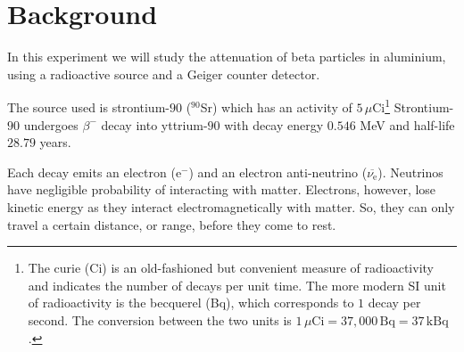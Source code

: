 \section{Background}%

In this experiment we will study the attenuation of beta particles in aluminium, using a radioactive source and a Geiger counter detector. 

The source used is strontium-$90$ ($^{90}$Sr) which has an activity of $5\,\mu$Ci\footnote{The curie (Ci) is an old-fashioned but convenient measure of radioactivity and indicates the number of decays per unit time. The more modern SI unit of radioactivity is the becquerel (Bq), which corresponds to $1$ decay per second. The conversion between the two units is $1\,\mu\textrm{Ci} = 37,000\,\textrm{Bq} = 37\,\textrm{kBq}$.} Strontium-$90$ undergoes $\beta^{-}$ decay into yttrium-$90$ with decay energy $0.546$ MeV and half-life $28.79$ years. 

Each decay emits an electron ($\mathrm{e}^-$)  and an electron anti-neutrino ($\overbar{\nu_\mathrm{e}}$). Neutrinos have negligible probability of interacting with matter. Electrons, however, lose kinetic energy as they interact electromagnetically with matter. So, they can only travel a certain distance, or range, before they come to rest.